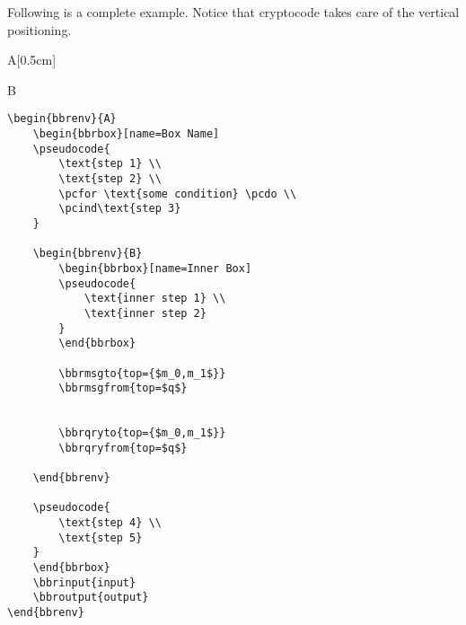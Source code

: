 \documentclass[a4paper]{report}
\begin{document}
Following is a complete example. Notice that cryptocode takes care of the vertical positioning.

\begin{bbrenv}[1cm]{A}[0.5cm]
	\begin{bbrbox}[name=Box Name]

	\begin{bbrenv}{B}
		\begin{bbrbox}[name=Inner Box]
		\end{bbrbox}




	\end{bbrenv}

	\end{bbrbox}
\end{bbrenv}

\begin{lstlisting}
\begin{bbrenv}{A}
	\begin{bbrbox}[name=Box Name]
	\pseudocode{
		\text{step 1} \\
		\text{step 2} \\
		\pcfor \text{some condition} \pcdo \\
		\pcind\text{step 3}
	}

	\begin{bbrenv}{B}
		\begin{bbrbox}[name=Inner Box]
		\pseudocode{
			\text{inner step 1} \\
			\text{inner step 2}
		}
		\end{bbrbox}

		\bbrmsgto{top={$m_0,m_1$}}
		\bbrmsgfrom{top=$q$}


		\bbrqryto{top={$m_0,m_1$}}
		\bbrqryfrom{top=$q$}

	\end{bbrenv}

	\pseudocode{
		\text{step 4} \\
		\text{step 5}
	}
	\end{bbrbox}
	\bbrinput{input}
	\bbroutput{output}
\end{bbrenv}
\end{lstlisting}
\end{document}
